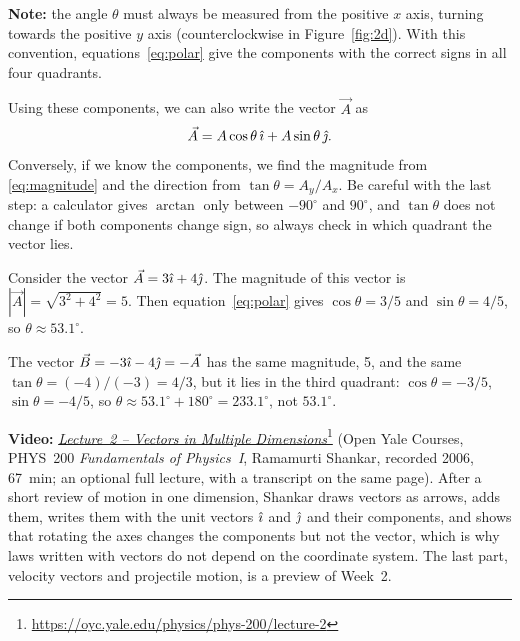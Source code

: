 \documentclass[11pt,a4paper]{article}
\begin{document}
\textbf{Note:} the angle $\theta$ must always be measured from the positive $x$ axis, turning
towards the positive $y$ axis (counterclockwise in Figure~\ref{fig:2d}). With this convention,
equations~\eqref{eq:polar} give the components with the correct signs in all four quadrants.

Using these components, we can also write the vector $\vec{A}$ as
\begin{equation}\label{eq:polarvec}
  \vec{A} = A\cos\theta\,\hat{\imath} + A\sin\theta\,\hat{\jmath} .
\end{equation}
Conversely, if we know the components, we find the magnitude from \eqref{eq:magnitude} and the
direction from $\tan\theta = A_y/A_x$. Be careful with the last step: a calculator gives
$\arctan$ only between $-90^\circ$ and $90^\circ$, and $\tan\theta$ does not change if both
components change sign, so always check in which quadrant the vector lies.

\begin{example}
Consider the vector $\vec{A} = 3\hat{\imath} + 4\hat{\jmath}$. The magnitude of this vector
is $|\vec{A}| = \sqrt{3^2 + 4^2} = 5$. Then equation~\eqref{eq:polar} gives $\cos\theta = 3/5$ and
$\sin\theta = 4/5$, so $\theta \approx 53.1^\circ$.

The vector $\vec{B} = -3\hat{\imath} - 4\hat{\jmath} = -\vec{A}$ has the same magnitude, 5, and the same
$\tan\theta = (-4)/(-3) = 4/3$, but it lies in the third quadrant: $\cos\theta = -3/5$,
$\sin\theta = -4/5$, so $\theta \approx 53.1^\circ + 180^\circ = 233.1^\circ$, not $53.1^\circ$.
\end{example}

\begin{aside}
\textbf{Video:}
\href{https://oyc.yale.edu/physics/phys-200/lecture-2}{\emph{Lecture~2 -- Vectors in Multiple
Dimensions}}\footnote{\url{https://oyc.yale.edu/physics/phys-200/lecture-2}} (Open Yale Courses,
PHYS~200 \emph{Fundamentals of Physics~I}, Ramamurti Shankar, recorded 2006, 67~min; an optional
full lecture, with a transcript on the same page). After a short review of motion in one
dimension, Shankar draws vectors as arrows, adds them, writes them with the unit vectors $\hat{\imath}$
and $\hat{\jmath}$ and their components, and shows that rotating the axes changes the components but not
the vector, which is why laws written with vectors do not depend on the coordinate system. The
last part, velocity vectors and projectile motion, is a preview of Week~2.
\end{aside}
\end{document}
